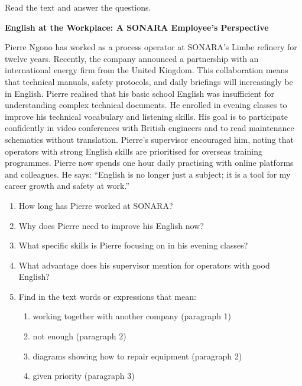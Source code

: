 \documentclass[11pt]{article}
\begin{document}
\begin{exercice}
Read the text and answer the questions.

\textbf{English at the Workplace: A SONARA Employee's Perspective}

Pierre Ngono has worked as a process operator at SONARA's Limbe refinery for twelve years. Recently, the company announced a partnership with an international energy firm from the United Kingdom. This collaboration means that technical manuals, safety protocols, and daily briefings will increasingly be in English. Pierre realised that his basic school English was insufficient for understanding complex technical documents. He enrolled in evening classes to improve his technical vocabulary and listening skills. His goal is to participate confidently in video conferences with British engineers and to read maintenance schematics without translation. Pierre's supervisor encouraged him, noting that operators with strong English skills are prioritised for overseas training programmes. Pierre now spends one hour daily practising with online platforms and colleagues. He says: ``English is no longer just a subject; it is a tool for my career growth and safety at work.''

\begin{enumerate}
    \item How long has Pierre worked at SONARA?
    \item Why does Pierre need to improve his English now?
    \item What specific skills is Pierre focusing on in his evening classes?
    \item What advantage does his supervisor mention for operators with good English?
    \item Find in the text words or expressions that mean:
    \begin{enumerate}
        \item working together with another company (paragraph 1)
        \item not enough (paragraph 2)
        \item diagrams showing how to repair equipment (paragraph 2)
        \item given priority (paragraph 3)
    \end{enumerate}
\end{enumerate}
\end{exercice}
\end{document}
